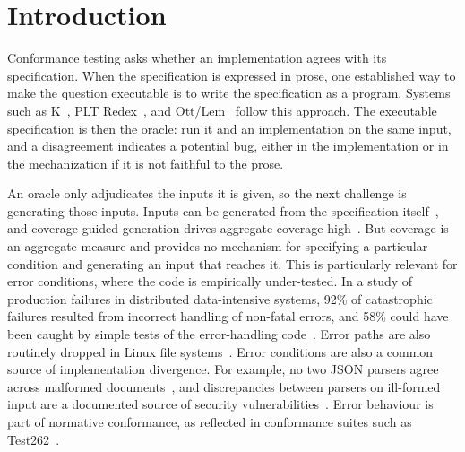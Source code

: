 \documentclass[sigconf,screen]{acmart}
\theoremstyle{definition}
\theoremstyle{remark}
\begin{document}
\section{Introduction}
\label{sec:intro}

Conformance testing asks whether an implementation agrees with its
specification. When the specification is expressed in prose, one established way to make the
question executable is to write the specification as a program. Systems such as K~\cite{rosu2010k}, PLT
Redex~\cite{felleisen2009redex}, and Ott/Lem~\cite{sewell2007ott,mulligan2014lem} follow this approach. The executable specification is then the oracle: run it and an implementation on the same input, and a disagreement indicates a potential bug, either in the implementation or in the mechanization if it is not faithful to the prose.

An oracle only adjudicates the inputs it is given, so the next challenge is generating those inputs. Inputs can be generated from the specification
itself~\cite{park2021jest}, and coverage-guided generation drives aggregate
coverage high~\cite{lemieux2023codamosa}. But coverage is an aggregate measure and provides no mechanism for specifying a particular condition and generating an input that reaches it. This is particularly relevant for error conditions, where the code is empirically under-tested. In a study of production failures in distributed data-intensive systems, 92\% of catastrophic failures
resulted from incorrect handling of non-fatal errors, and 58\% could have been
caught by simple tests of the error-handling code~\cite{yuan2014simple}. Error paths are also routinely dropped in Linux file systems~\cite{gunawi2008eio}. Error conditions are also a common source of implementation divergence. For example, no two JSON parsers agree across malformed
documents~\cite{seriot2016json}, and discrepancies between parsers on ill-formed
input are a documented source of security
vulnerabilities~\cite{sassaman2013langsec,brubaker2014frankencerts}. Error behaviour is part of normative conformance, as reflected in conformance suites such as Test262~\cite{tc39test262}.
\end{document}
